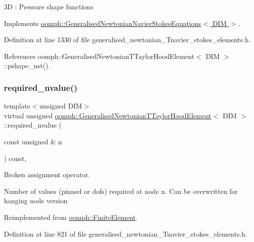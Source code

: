 3D \+: Pressure shape functions 

Implements \hyperlink{classoomph_1_1GeneralisedNewtonianNavierStokesEquations_a84735d21f3d1ade819726a71a7b462e1}{oomph\+::\+Generalised\+Newtonian\+Navier\+Stokes\+Equations$<$ D\+I\+M $>$}.



Definition at line 1330 of file generalised\+\_\+newtonian\+\_\+\+Tnavier\+\_\+stokes\+\_\+elements.\+h.



References oomph\+::\+Generalised\+Newtonian\+T\+Taylor\+Hood\+Element$<$ D\+I\+M $>$\+::pshape\+\_\+nst().

\mbox{\label{classoomph_1_1GeneralisedNewtonianTTaylorHoodElement_a6b113f1ccc3b67fe9f9deea3336fb126}} 
\subsubsection{\texorpdfstring{required\+\_\+nvalue()}{required\_nvalue()}}
{\footnotesize\ttfamily template$<$unsigned D\+IM$>$ \\
virtual unsigned \hyperlink{classoomph_1_1GeneralisedNewtonianTTaylorHoodElement}{oomph\+::\+Generalised\+Newtonian\+T\+Taylor\+Hood\+Element}$<$ D\+IM $>$\+::required\+\_\+nvalue (\begin{DoxyParamCaption}\item[{const unsigned \&}]{n }\end{DoxyParamCaption}) const\hspace{0.3cm}{\ttfamily [inline]}, {\ttfamily [virtual]}}



Broken assignment operator. 

Number of values (pinned or dofs) required at node n. Can be overwritten for hanging node version 

Reimplemented from \hyperlink{classoomph_1_1FiniteElement_a56610c60d5bc2d7c27407a1455471b1a}{oomph\+::\+Finite\+Element}.



Definition at line 821 of file generalised\+\_\+newtonian\+\_\+\+Tnavier\+\_\+stokes\+\_\+elements.\+h.



